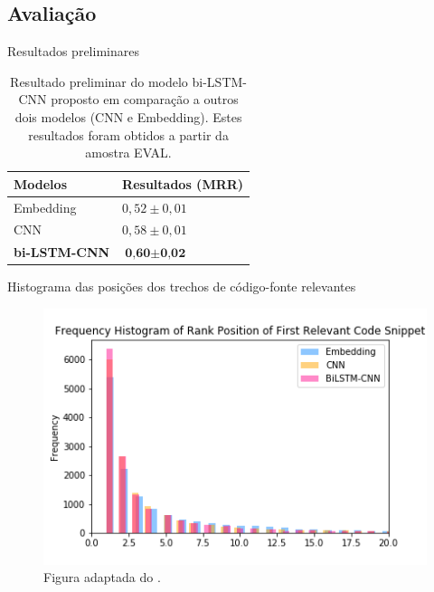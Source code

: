 \documentclass[10pt]{beamer}
\begin{document}
\subsection{Avaliação}
\begin{frame}{Resultados preliminares}
  \begin{table}[h]
\centering
\begin{tabular}{ p{3cm} p{3cm} }
 \hline
 \textbf{Modelos} & \textbf{Resultados (MRR)}\\
 \hline
 Embedding & $0,52 \pm 0,01$\\
 
 CNN & $0,58 \pm 0,01 $ \\
 
 \textbf{bi-LSTM-CNN} & $\textbf{0,60} \pm \textbf{0,02}$\\
 \hline
\end{tabular}
\caption{Resultado preliminar do modelo bi-LSTM-CNN proposto em comparação a outros dois modelos (CNN e Embedding). Estes resultados foram obtidos a partir da amostra EVAL.}
\label{table:resultados-preliminares}
\end{table}
\end{frame}

\begin{frame}{Histograma das posições dos trechos de código-fonte relevantes}
  \begin{figure}[h]
    \centering
    \includegraphics[width=1\textwidth]{histogram_results.png}
    \caption{Figura adaptada do \cite{tan-lstm-qa}.}
    \label{fig:histogram-results}
\end{figure}
\end{frame}
\end{document}
